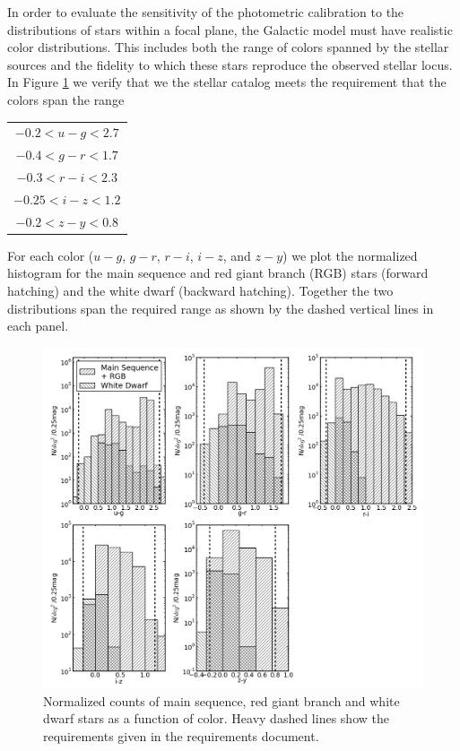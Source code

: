 \documentclass[]{article}
\begin{document}
In order to evaluate the sensitivity of the photometric calibration to
the distributions of stars within a focal plane, the Galactic model
must have realistic color distributions.  This includes both the range
of colors spanned by the stellar sources and the fidelity to which
these stars reproduce the observed stellar locus. In Figure
\ref{fig:starcolorspan} we verify that we the stellar catalog meets
the requirement that the colors span the range
\begin{center}
\begin{tabular}{c}
      $ -0.2 < u-g <        2.7 $\\
       $  -0.4  <  g-r <       1.7 $\\
        $ -0.3   <  r-i <    2.3 $\\
        $  -0.25 < i-z <       1.2 $\\ 
        $  -0.2 <  z-y   <    0.8 $
\end{tabular}
\end{center}
For each color ($u-g$, $g-r$, $r-i$,
$i-z$, and $z-y$) we plot the normalized histogram for the main
sequence and red giant branch (RGB) stars (forward hatching) and the
white dwarf (backward hatching).  Together the two distributions span
the required range as shown by the dashed vertical lines in each
panel.
\begin{figure}[H]
\centering
\includegraphics[width=5in]{validation_figures/star_lsst_color_hist.png}
\caption{Normalized counts of main sequence, red giant branch and white dwarf stars as a function of color.  Heavy dashed lines show the requirements given in the requirements document.\label{fig:starcolorspan}}
\end{figure}
\end{document}
